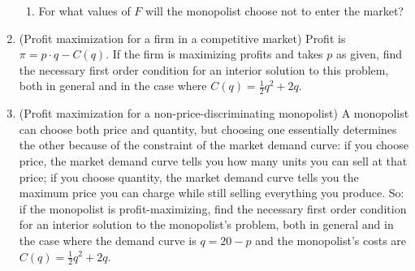 \begin{CALCULUS}
\begin{enumerate}
\begin{enumerate}
    \item For what values of $F$ will the monopolist choose not to enter the market?

    \end{enumerate}




\item (Profit maximization for a firm in a competitive market) Profit is $\pi = p\cdot q - C(q).$ If the firm is maximizing profits and takes $p$ as given, find the necessary first order condition for an interior solution to this problem, both in general and in the case where $\displaystyle C(q)=\frac{1}{2}q^2 +2q$.





\item (Profit maximization for a non-price-discriminating monopolist) A monopolist can choose both price and quantity, but choosing one essentially determines the other because of the constraint of the market demand curve: if you choose price, the market demand curve tells you how many units you can sell at that price; if you choose quantity, the market demand curve tells you the maximum price you can charge while still selling everything you produce. So: if the monopolist is profit-maximizing, find the necessary first order condition for an interior solution to the monopolist's problem, both in general and in the case where the demand curve is $q = 20 - p$ and the monopolist's costs are $\displaystyle C(q)=\frac{1}{2}q^2 +2q$.





\end{enumerate}
\end{CALCULUS}
